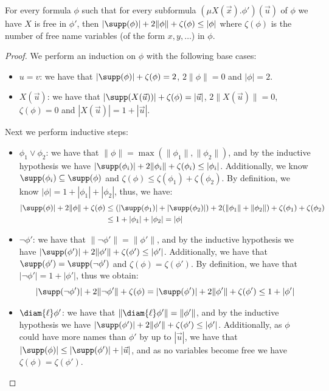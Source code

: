 \begin{lemma}\label{lem:sizebound}
	For every formula $\phi$ such that for every subformula $(\mu X(\vec x).\phi')(\vec u)$ of $\phi$ we have $X$ is free in $\phi'$, then $|\supp(\phi)|+2\|\phi\|+\zeta(\phi)\leq|\phi|$ where $\zeta(\phi)$ is the number of free name variables (of the form $x, y, \dots$) in $\phi$.
\end{lemma}
\begin{proof}
	We perform an induction on $\phi$ with the following base cases:
	\begin{itemize}
		\item $u=v$: we have that $|\supp(\phi)| + \zeta(\phi) = 2$, $2\|\phi\| = 0$  and $|\phi| = 2$. 
		\item $X(\vec u)$: we have that $|\supp(X(\vec u))| + \zeta(\phi) = |\vec u|$, $2\|X(\vec u)\| = 0$, $\zeta(\phi)=0$ and $|X(\vec u)| = 1 + |\vec u|$.
	\end{itemize}
	Next we perform inductive steps:
	\begin{itemize}
		\item $\phi_1 \lor \phi_2$: 
				we have that 
				$\|\phi\| = \max(\|\phi_1\|, \|\phi_2\|)$,
		and by the inductive hypothesis we have $|\supp(\phi_i)| + 2\|\phi_i\| + \zeta(\phi_i) \le |\phi_i|$.
		Additionally, we know $\supp(\phi_i) \subseteq \supp(\phi)$ and $\zeta(\phi) \le \zeta(\phi_1) + \zeta(\phi_2)$. 
		By definition, we know $|\phi| = 1 + |\phi_1| + |\phi_2|$, 
		thus, we have:
		\begin{align*}
			|\supp(\phi)| + 2\|\phi\| + \zeta(\phi)&\le (|\supp(\phi_1)| + |\supp(\phi_2)|) + 2(\|\phi_1\| + \|\phi_2\|) + \zeta(\phi_1) + \zeta(\phi_2) 
			\\&\le 1 + |\phi_1| + |\phi_2| = |\phi|
		\end{align*}
				\item $\lnot \phi'$: we have that $\|\lnot \phi'\| = \|\phi'\|$, and by the inductive hypothesis we have $|\supp(\phi')| + 2\|\phi'\| + \zeta(\phi') \le |\phi'|$. 
		Additionally, we have that $\supp(\phi') = \supp(\lnot \phi')$ and $\zeta(\phi) = \zeta(\phi')$.
		By definition, we have that $|\lnot \phi'| = 1 + |\phi'|$, thus we obtain:
		\[
		|\supp(\lnot \phi')| + 2\|\lnot \phi'\| + \zeta(\phi)= |\supp(\phi')| + 2\|\phi'\| + \zeta(\phi')\le 1 + |\phi'|
		\]
				\item $\diam{\ell} \phi'$: 
		we have that $\|\diam{\ell}\phi'\| = \|\phi'\|$, and by the inductive hypothesis we have $|\supp(\phi')| + 2\|\phi'\| + \zeta(\phi') \le |\phi'|$. 
		Additionally, as $\phi$ could have more names than $\phi'$ by up to $|\vec u|$, we have that $|\supp(\phi)| \le |\supp(\phi')| + |\vec u|$, and as no variables become free we have $\zeta(\phi) = \zeta(\phi')$.

\end{itemize}
\end{proof}
